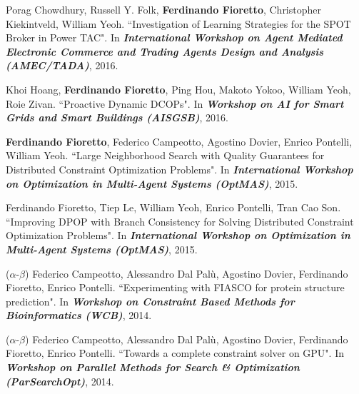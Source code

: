 \item 
	Porag Chowdhury, Russell Y. Folk, {\bf Ferdinando Fioretto}, Christopher Kiekintveld, William Yeoh.
	{``Investigation of Learning Strategies for the SPOT Broker in Power TAC"}.
  	In \emph{\bf International Workshop on Agent Mediated Electronic Commerce and Trading Agents Design and Analysis
	(AMEC/TADA)}, 2016.


\item 
	Khoi Hoang, {\bf Ferdinando Fioretto}, Ping Hou, Makoto Yokoo, William Yeoh, Roie Zivan.
	{``Proactive Dynamic DCOPs"}. 
	In \emph{{\bf Workshop on AI for Smart Grids and Smart Buildings (AISGSB)}}, 2016.

\item 
	{\bf Ferdinando Fioretto}, Federico Campeotto, Agostino Dovier, Enrico Pontelli, William Yeoh.
	{``Large Neighborhood Search with Quality Guarantees for Distributed Constraint Optimization Problems"}. 
	In \emph{{\bf International Workshop on Optimization in Multi-Agent Systems (OptMAS)}}, 2015.

\item 
	Ferdinando Fioretto, Tiep Le, William Yeoh, Enrico Pontelli, Tran Cao Son. 
	{``Improving DPOP with Branch Consistency for Solving Distributed Constraint Optimization Problems}".
	In \emph{{\bf International Workshop on Optimization in Multi-Agent Systems (OptMAS)}}, 2015.

\item 
	($\alpha$-$\beta$) 
	Federico Campeotto, Alessandro Dal Pal\`{u}, Agostino Dovier, Ferdinando Fioretto, Enrico Pontelli. 
	  	{``Experimenting with FIASCO for protein structure prediction"}.
	In \emph{{\bf Workshop on Constraint Based Methods for Bioinformatics (WCB)}}, 2014. 

\item 
	($\alpha$-$\beta$) 
 	 Federico Campeotto, Alessandro Dal Pal\`{u}, Agostino Dovier, Ferdinando Fioretto, Enrico Pontelli.
	 {``Towards a complete constraint solver on GPU"}.
	 In \emph{{\bf Workshop on Parallel Methods for Search \& Optimization (ParSearchOpt)}}, 2014.


